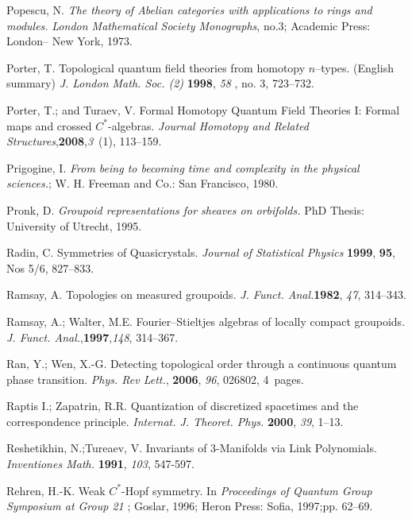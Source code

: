 \documentclass[12pt]{article}
\theoremstyle{plain}
\theoremstyle{definition}
\numberwithin{equation}{section}
\begin{document}
\begin{thebibliography}{99}
Popescu, N. {\em The theory of Abelian categories with applications to rings and modules.} {\em London Mathematical Society Monographs}, no.3; Academic Press: London-- New York, 1973.

Porter, T. Topological quantum field theories from homotopy $n$--types. (English summary)
{\em J. London Math. Soc. (2) } {\bf 1998}, {\em 58 }, no. 3, 723--732.

Porter, T.; and Turaev, V. Formal Homotopy Quantum Field Theories {I}: Formal maps and crossed {$C^*$-}algebras.
{\em Journal Homotopy and Related Structures},{\bf 2008},{\em 3}~(1), 113--159.

Prigogine, I. {\em From being to becoming time and complexity in the physical sciences.}; W. H. Freeman and Co.: San Francisco, 1980.

Pronk, D. {\em Groupoid representations for sheaves on orbifolds.} PhD Thesis: University of Utrecht, 1995.

Radin, C. Symmetries of Quasicrystals. {\em Journal of Statistical Physics} {\bf 1999}, {\bf 95}, Nos 5/6, 827--833.

Ramsay, A. Topologies on measured groupoids. {\em J. Funct. Anal.}{\bf 1982}, {\em 47}, 314--343.

Ramsay, A.; Walter, M.E. Fourier--Stieltjes algebras of locally compact groupoids. {\em J. Funct. Anal.},{\bf 1997},{\em 148}, 314--367. %

Ran, Y.; Wen, X.-G. Detecting topological order through a continuous quantum phase transition. {\em Phys. Rev Lett.}, {\bf 2006}, {\em 96}, 026802, 4~pages.

Raptis I.; Zapatrin, R.R. Quantization of discretized spacetimes and the correspondence principle. {\em Internat. J. Theoret. Phys.} {\bf 2000}, {\em 39}, 1--13.

Reshetikhin, N.;Tureaev, V. Invariants of $3$-Manifolds via Link Polynomials. {\em Inventiones Math.} {\bf 1991}, {\em 103}, 547-597.

Rehren, H.-K. Weak $C^*$-Hopf symmetry. In {\em Proceedings of Quantum Group Symposium at Group 21} ; Goslar, 1996; Heron Press: Sofia, 1997;pp. 62--69. 


\end{thebibliography}
\end{document}
